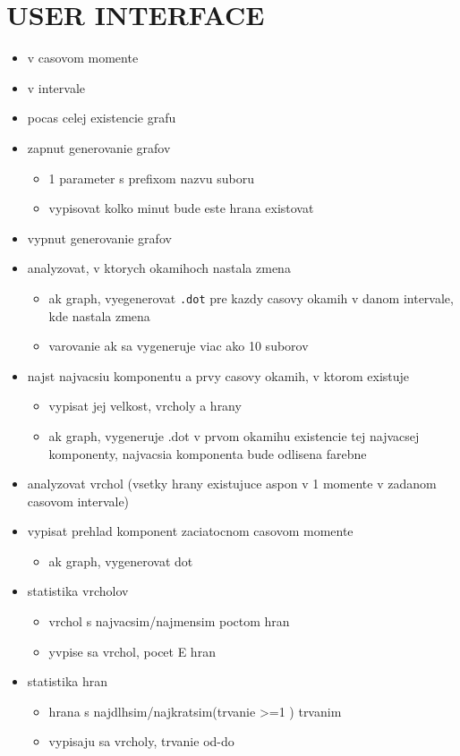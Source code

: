 \documentclass[11pt, a4paper]{article}
\theoremstyle{plain}
\theoremstyle{definition}
\theoremstyle{remark}
\begin{document}
\section{USER INTERFACE}

\begin{itemize}
    \item v casovom momente
    \item v intervale
    \item pocas celej existencie grafu

    \item zapnut generovanie grafov
        \begin{itemize}
             \item 1 parameter s prefixom nazvu suboru
             \item vypisovat kolko minut bude este hrana existovat
         \end{itemize}
    \item vypnut generovanie grafov

    \item analyzovat, v ktorych okamihoch nastala zmena
        \begin{itemize}
            \item ak graph, vyegenerovat \texttt{.dot} pre kazdy casovy okamih v danom intervale, kde nastala zmena
             \item varovanie ak sa vygeneruje viac ako 10 suborov
         \end{itemize}
    \item najst najvacsiu komponentu a prvy casovy okamih, v ktorom existuje
        \begin{itemize}
              \item vypisat jej velkost, vrcholy a hrany
              \item ak graph, vygeneruje .dot v prvom okamihu existencie tej najvacsej komponenty, najvacsia komponenta bude odlisena farebne
          \end{itemize}
    \item analyzovat vrchol (vsetky hrany existujuce aspon v 1 momente v zadanom casovom intervale)
    \item vypisat prehlad komponent zaciatocnom casovom momente
        \begin{itemize}
           \item ak graph, vygenerovat dot
        \end{itemize}
    \item statistika vrcholov
        \begin{itemize}
          \item vrchol s najvacsim/najmensim poctom hran
          \item yvpise sa vrchol, pocet E hran
      \end{itemize}
    \item statistika hran
        \begin{itemize}
          \item hrana s najdlhsim/najkratsim(trvanie >=1 ) trvanim
          \item vypisaju sa vrcholy, trvanie od-do
        \end{itemize}
\end{itemize}
\end{document}
